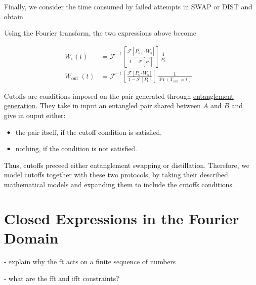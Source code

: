 \documentclass{masterthesis}
\begin{document}
Finally, we consider the time consumed by failed attempts in SWAP or DIST and obtain


Using the Fourier transform, the two expressions above become

$$
\begin{aligned}
W_{\mathrm{s}}(t) & =\mathcal{F}^{-1}\left[\frac{\mathcal{F}\left[P_{\mathrm{s}, \mathrm{s}}^{\prime} \cdot W_{\mathrm{s}}^{\prime}\right]}{1-\mathcal{F}\left[P_{\mathrm{f}}^{\prime}\right]}\right] \frac{1}{P_{\mathrm{s}}} \\
W_{\text {out }}(t) & =\mathcal{F}^{-1}\left[\frac{\mathcal{F}\left[P_{\mathrm{s}} \cdot W_{\mathrm{s}}\right]}{1-\mathcal{F}\left[P_{\mathrm{f}}\right]}\right] \frac{1}{\operatorname{Pr}\left(T_{\text {out }}=t\right)}
\end{aligned}
$$


Cutoffs are conditions imposed on the pair generated through \hyperref[section:heralded_entanglement_generation]{entanglement generation}.
They take in input an entangled pair shared between $A$ and $B$ and give in ouput either:
\begin{itemize}
    \item the pair itself, if the cutoff condition is satisfied,
    \item nothing, if the condition is not satisfied.
\end{itemize} 

Thus, cutoffs preceed either entanglement swapping or distillation. Therefore, we model cutoffs together with these two protocols, by taking their described mathematical models and expanding them to include the cutoffs conditions.


\section*{Closed Expressions in the Fourier Domain}



- explain why the ft acts on a finite sequence of numbers

- what are the fft and ifft constraints?
\end{document}
